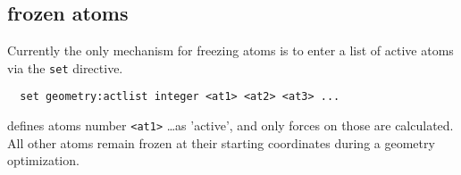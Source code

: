 \subsection{frozen atoms}
\label{sec:activeatoms}

Currently the only mechanism for freezing atoms is to enter a list of
active atoms via the \verb+set+ directive.

\begin{verbatim}
  set geometry:actlist integer <at1> <at2> <at3> ...
\end{verbatim}
defines atoms number \verb+<at1>+ \ldots as 'active', and only forces
on those are calculated. All other atoms remain frozen at their
starting coordinates during a geometry optimization.

